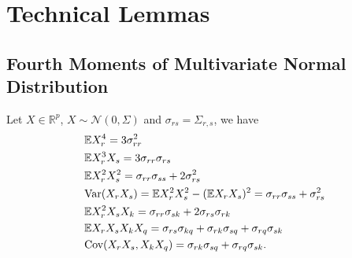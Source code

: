 \section{Technical Lemmas}
\label{sec:technical_lemmas}
\subsection{\bf Fourth Moments of Multivariate Normal Distribution}
\label{subsec: gaussian_fourth_moments}
Let $X\in \mathbb{R}^p$, $X\sim \mathcal{N}(0, \Sigma)$ and $\sigma_{rs} = \Sigma_{r,s}$, we have 
\begin{equation}
\label{eq:gauss_fourth_moment}
\begin{aligned}
&\mathbb{E} X^4_r = 3\sigma_{rr}^2\\
&\mathbb{E}X^3_rX_s = 3\sigma_{rr}\sigma_{rs}\\
&\mathbb{E}X^2_rX^2_s = \sigma_{rr}\sigma_{ss}+2\sigma^2_{rs}\\
&\mbox{Var}(X_rX_s) = \mathbb{E}X^2_rX^2_s-(\mathbb{E}X_rX_s)^2 =\sigma_{rr}\sigma_{ss}+\sigma^2_{rs}\\
&\mathbb{E}X_r^2X_sX_k = \sigma_{rr}\sigma_
{sk}+2\sigma_{rs}\sigma_{rk}\\
&\mathbb{E}X_rX_sX_kX_q = \sigma_{rs}\sigma_{kq}+\sigma_{rk}\sigma_{sq}+\sigma_{rq}\sigma_{sk}\\
&\mbox{Cov}(X_rX_s, X_kX_q) = \sigma_{rk}\sigma_{sq}+\sigma_{rq}\sigma_{sk}.
\end{aligned}
\end{equation}

